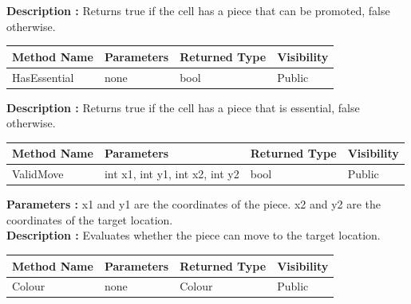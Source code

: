 \documentclass[12pt]{article}
\begin{document}
\textbf{Description :} Returns true if the cell has a piece that can be promoted, false otherwise.  

\begin{table}[H]
    \begin{tabular}{|l|l|l|l|}
    \hline
    \rowcolor[HTML]{EFEFEF} 
    \cellcolor[HTML]{EFEFEF}\textbf{Method Name} & \textbf{Parameters}     & \textbf{Returned Type} & \textbf{Visibility} \\ \hline
    HasEssential                                 & none                    & bool                   & Public              \\ \hline
    \end{tabular}
\end{table}

\textbf{Description :} Returns true if the cell has a piece that is essential, false otherwise.   

\begin{table}[H]
    \begin{tabular}{|l|l|l|l|}
    \hline
    \rowcolor[HTML]{EFEFEF} 
    \cellcolor[HTML]{EFEFEF}\textbf{Method Name} & \textbf{Parameters}            & \textbf{Returned Type} & \textbf{Visibility} \\ \hline
    ValidMove                                    & int x1, int y1, int x2, int y2 & bool                   & Public              \\ \hline
    \end{tabular}
\end{table}

\textbf{Parameters :} x1 and y1 are the coordinates of the piece.
x2 and y2 are the coordinates of the target location. 
\\

\textbf{Description :} Evaluates whether the piece can move to the target location. 

\begin{table}[H]
    \begin{tabular}{|l|l|l|l|}
    \hline
    \rowcolor[HTML]{EFEFEF} 
    \cellcolor[HTML]{EFEFEF}\textbf{Method Name} & \textbf{Parameters}     & \textbf{Returned Type} & \textbf{Visibility} \\ \hline
    Colour                                       & none                    & Colour                   & Public              \\ \hline
    \end{tabular}
\end{table}
\end{document}

